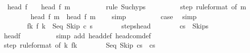 \begin{isabellebody}
\ {\isachardoublequoteopen}{\isasymGamma}{\isasymturnstile}\ head\ {\isacharparenleft}f\ {}{\isacharparenright}\ {\isasymrightarrow}\isactrlsup {\isacharasterisk}\ \ head\ {\isacharparenleft}f\ m{\isacharparenright}{\isachardoublequoteclose}\isanewline
\ \ \ \ \ \ \ \ \isamarkupfalse%
\ {\isacharparenleft}rule\ Suc{\isachardot}hyps{\isacharparenright}\isanewline
\ \ \ \ \ \ \isamarkupfalse%
\ \isamarkupfalse%
\ step\ {\isacharbrackleft}rule{\isacharunderscore}format{\isacharcomma}\ of\ m{\isacharbrackright}\isanewline
\ \ \ \ \ \ \isamarkupfalse%
\ {\isachardoublequoteopen}{\isasymGamma}{\isasymturnstile}\ head\ {\isacharparenleft}f\ m{\isacharparenright}\ {\isasymrightarrow}\ head\ {\isacharparenleft}f\ {\isacharparenleft}m\ {\isacharplus}\ {}{\isacharparenright}{\isacharparenright}{\isachardoublequoteclose}\ \isamarkupfalse%
\ simp\isanewline
\ \ \ \ \ \ \isamarkupfalse%
\ \isamarkupfalse%
\ {\isacharquery}case\ \isamarkupfalse%
\ simp\isanewline
\ \ \ \ \isamarkupfalse%
\isanewline
\ \ \ \ \isacommand{{\isacharbraceleft}}\isamarkupfalse%
\isanewline
\ \ \ \ \ \ \isamarkupfalse%
\ f{\isacharunderscore}k{\isacharcolon}\ {\isachardoublequoteopen}f\ k\ {\isacharequal}\ {\isacharparenleft}Seq\ Skip\ c\ s{\isacharprime}{\isacharparenright}{\isachardoublequoteclose}\isanewline
\ \ \ \ \ \ \isamarkupfalse%
\ steps{\isacharunderscore}head\isanewline
\ \ \ \ \ \ \isamarkupfalse%
\ {\isachardoublequoteopen}{\isasymGamma}{\isasymturnstile}{\isacharparenleft}cs{\isacharparenright}\ {\isasymrightarrow}\isactrlsup {\isacharasterisk}\ {\isacharparenleft}Skip{\isacharcomma}s{\isacharprime}{\isacharparenright}{\isachardoublequoteclose}\isanewline
\ \ \ \ \ \ \ \ \isamarkupfalse%
\ head{\isacharunderscore}f{\isacharunderscore}{}\isanewline
\ \ \ \ \ \ \ \ \isamarkupfalse%
\ {\isacharparenleft}simp\ add{\isacharcolon}\ head{\isacharunderscore}def\ head{\isacharunderscore}com{\isacharunderscore}def{\isacharparenright}\isanewline
\ \ \ \ \ \ \isamarkupfalse%
\isanewline
\ \ \ \ \ \ \isamarkupfalse%
\ step\ {\isacharbrackleft}rule{\isacharunderscore}format{\isacharcomma}\ of\ k{\isacharbrackright}\ f{\isacharunderscore}k\isanewline
\ \ \ \ \ \ \isamarkupfalse%
\ {\isachardoublequoteopen}{\isasymGamma}{\isasymturnstile}{\isacharparenleft}Seq\ Skip\ cs{\isacharprime}{\isacharparenright}\ {\isasymrightarrow}\ {\isacharparenleft}cs{\isacharprime}{\isacharparenright}{\isachardoublequoteclose}\ \isanewline

\end{isabellebody}
